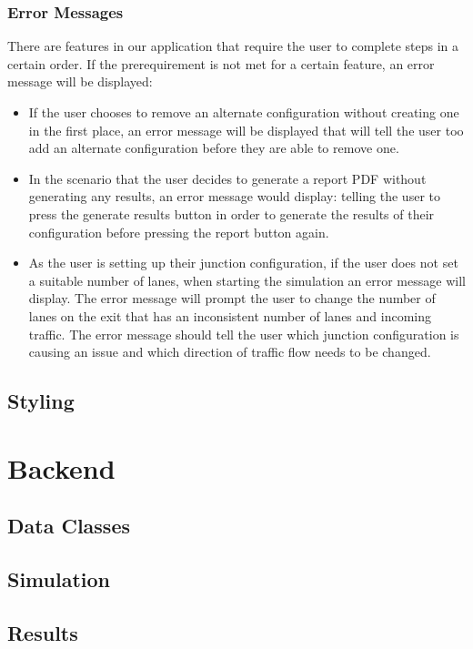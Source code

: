 \documentclass{article}
\begin{document}
    \subsubsection{Error Messages}
    There are features in our application that require the user to complete steps in a certain order. If the prerequirement is not met for a certain feature, an error message will be displayed:
    \begin{itemize}
        \item If the user chooses to remove an alternate configuration without creating one in the first place, an error message will be displayed that will tell the user too add an alternate configuration before they are able to remove one.
        \item In the scenario that the user decides to generate a report PDF without generating any results, an error message would display: telling the user to press the generate results button in order to generate the results of their configuration before pressing the report button again.
        \item As the user is setting up their junction configuration, if the user does not set a suitable number of lanes, when starting the simulation an error message will display. The error message will prompt the user to change the number of lanes on the exit that has an inconsistent number of lanes and incoming traffic. The error message should tell the user which junction configuration is causing an issue and which direction of traffic flow needs to be changed.
    \end{itemize}

    \subsection{Styling}

\section{Backend}

    \subsection{Data Classes}

    \subsection{Simulation}

    \subsection{Results}
\end{document}

